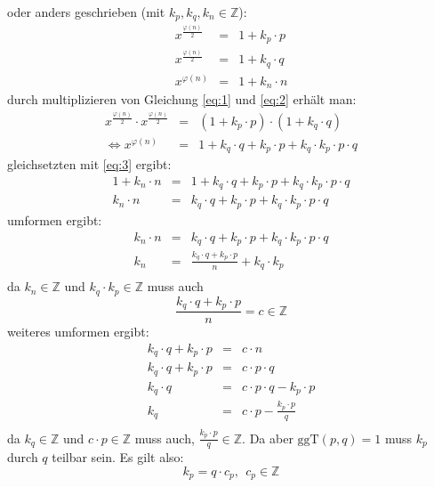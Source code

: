 \documentclass[DIN, pagenumber=false, fontsize=11pt, parskip=half]{scrartcl}
\begin{document}
\begin{enumerate}[label=(\roman*)]
            oder anders geschrieben (mit $k_p, k_q, k_n \in \mathbb{Z}$):
            \begin{eqnarray}
                x^{\frac{\varphi(n)}{2}} &=& 1 + k_p \cdot p \label{eq:1} \\
                x^{\frac{\varphi(n)}{2}} &=& 1 + k_q \cdot  q \label{eq:2} \\
                x^{\varphi(n)} &=& 1 + k_n \cdot  n \label{eq:3}
            \end{eqnarray}
            durch multiplizieren von Gleichung \ref{eq:1} und \ref{eq:2} erhält man:
            \begin{eqnarray}
                x^{\frac{\varphi(n)}{2}} \cdot x^{\frac{\varphi(n)}{2}}
                    &=& (1 + k_p \cdot p) \cdot (1 + k_q \cdot q) \\
                \Leftrightarrow x^{\varphi(n)} &=& 1 + k_q \cdot q + k_p \cdot p + k_q \cdot k_p \cdot p \cdot q
            \end{eqnarray}
            gleichsetzten mit \ref{eq:3} ergibt:
            \begin{eqnarray}
                1 + k_n \cdot n &=& 1 + k_q \cdot q + k_p \cdot p + k_q \cdot k_p \cdot p \cdot q \\
                 k_n \cdot n &=& k_q \cdot q + k_p \cdot p + k_q \cdot k_p \cdot p \cdot q
            \end{eqnarray}
            umformen ergibt:
            \begin{eqnarray}
                 k_n \cdot n &=& k_q \cdot q + k_p \cdot p + k_q \cdot k_p \cdot p \cdot q \\
                 k_n &=& \frac{k_q \cdot q + k_p \cdot p}{n} + k_q \cdot k_p \\
            \end{eqnarray}
            da $k_n \in \mathbb{Z}$ und $k_q \cdot k_p \in \mathbb{Z}$ muss auch
            \begin{equation}
                \frac{k_q \cdot q + k_p \cdot p}{n} = c \in \mathbb{Z}
            \end{equation}
            weiteres umformen ergibt:
            \begin{eqnarray}
                k_q \cdot q + k_p \cdot p &=& c \cdot n \\
                k_q \cdot q + k_p \cdot p &=& c \cdot p \cdot q \\
                k_q \cdot q &=& c \cdot p \cdot q - k_p \cdot p \\
                k_q &=& c \cdot p- \frac{k_p \cdot p}{q} \\
            \end{eqnarray}
            da $k_q \in \mathbb{Z}$ und $c \cdot p \in \mathbb{Z}$ muss auch,
            $\frac{k_p \cdot p}{q} \in \mathbb{Z}$. Da aber $\text{ggT}(p, q)=1$
            muss $k_p$ durch $q$ teilbar sein. Es gilt also:
            \begin{equation}
                k_p = q \cdot c_p,\ \ c_p \in \mathbb{Z}
            \end{equation}


\end{enumerate}
\end{document}
